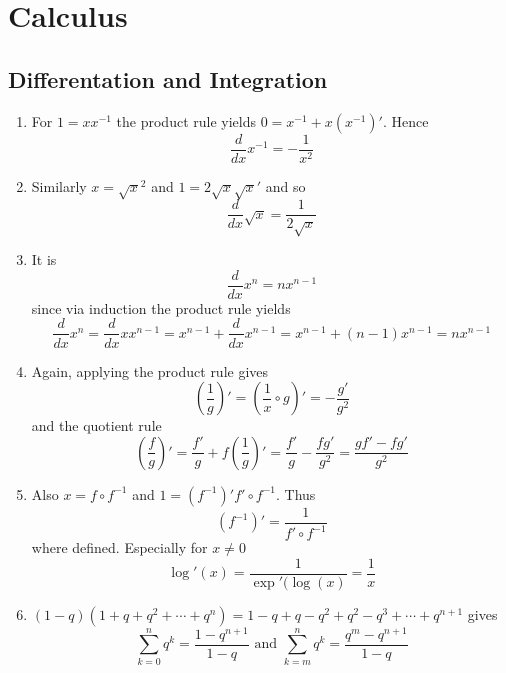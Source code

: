 
\newpage
\section{Calculus}

\subsection{Differentation and Integration}


\begin{lemma}\hfill
    \begin{enumerate}
        \item For \( 1 = x x^{-1} \) the product rule yields \( 0 = x^{-1} + x(x^{-1})' \). Hence
              \[
                  \frac{d}{dx} x^{-1} = -\frac{1}{x^2}
              \]
        \item Similarly \( x = \sqrt{x}^2 \) and \( 1 = 2 \sqrt{x} \sqrt{x}' \) and so
              \[
                  \frac{d}{dx} \sqrt{x} = \frac{1}{2\sqrt{x}}
              \]
        \item It is
              \[
                  \frac{d}{dx} x^n = nx^{n - 1}
              \]
              since via induction the product rule yields
              \[
                  \frac{d}{dx} x^n = \frac{d}{dx} xx^{n -1} = x^{n -1} + \frac{d}{dx} x^{n - 1} =
                  x^{n -1} + (n - 1)x^{n - 1}  = nx^{n - 1}
              \]
        \item Again, applying the product rule gives
              \[
                  \left(\frac{1}{g}\right)' = \left(\frac{1}{x} \circ g\right)' = -\frac{g'}{g^2}
              \]
              and the quotient rule
              \[
                  \left(\frac{f}{g}\right)' = \frac{f'}{g} + f \left(\frac{1}{g} \right)' =
                  \frac{f'}{g} -\frac{fg'}{g^2} = \frac{gf'- fg'}{g^2}
              \]
        \item Also \( x = f \circ f^{-1} \) and \( 1 = (f^{-1})'f' \circ f^{-1} \). Thus
              \[
                  (f^{-1})' = \frac{1}{f' \circ f^{-1}}
              \]
              where defined. Especially for \( x \ne 0 \)
              \[
                  \log'(x) = \frac{1}{\exp'(\log(x)} = \frac{1}{x}
              \]

        \item \( (1 - q) (1 + q + q^2 + \cdots + q^n) = 1 - q + q - q^2 + q^2 - q^3 + \cdots + q^{n+1} \) gives
              \[
                  \sum_{k=0}^n q^k = \frac{1 - q^{n+1}}{1 - q} \text{ and }
                  \sum_{k=m}^n q^k = \frac{q^m - q^{n+1}}{1 - q}
              \]
    \end{enumerate}
\end{lemma}
\bigskip


